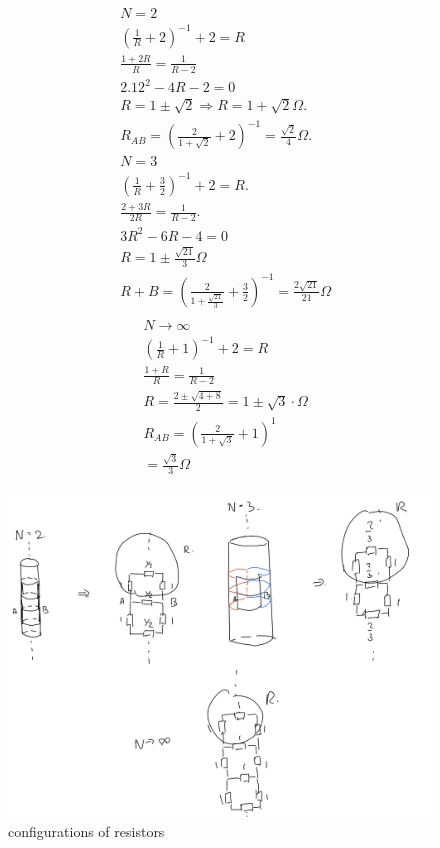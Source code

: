 \documentclass{article}
\begin{document}
$$
\begin{aligned}
& N=2 \\
& \left(\frac{1}{R}+2\right)^{-1}+2=R \\
& \frac{1+2 R}{R}=\frac{1}{R-2} \\
& 2.12^2-4 R-2=0 \\
& R=1 \pm \sqrt{2} \Rightarrow R=1+\sqrt{2} \Omega \text {. } \\
& R_{A B}=\left(\frac{2}{1+\sqrt{2}}+2\right)^{-1}=\frac{\sqrt{2}}{4} \Omega \text {. } \\
& N=3 \\
& \left(\frac{1}{R}+\frac{3}{2}\right)^{-1}+2=R . \\
& \frac{2+3 R}{2 R}=\frac{1}{R-2} . \\
& 3 R^2-6 R-4=0 \\
& R=1 \pm \frac{\sqrt{21}}{3} \Omega \\
& R+B=\left(\frac{2}{1+\frac{\sqrt{21}}{3}}+\frac{3}{2}\right)^{-1}=\frac{2 \sqrt{21}}{21} \Omega \\
&
\end{aligned}
$$
$$
\begin{aligned}
& N \rightarrow \infty \\
& \left(\frac{1}{R}+1\right)^{-1}+2=R \\
& \frac{1+R}{R}=\frac{1}{R-2} \\
& R=\frac{2 \pm \sqrt{4+8}}{2}=1 \pm \sqrt{3} \cdot \Omega \\
& R_{A B}=\left(\frac{2}{1+\sqrt{3}}+1\right)^1 \\
& =\frac{\sqrt{3}}{3} \Omega
\end{aligned}
$$
\begin{figure}
	\centering
	\includegraphics[width=0.7\linewidth]{spho_book_TYS_images/2012_sol_Q5.jpg}
	\caption{configurations of resistors}
\end{figure}
\end{document}
